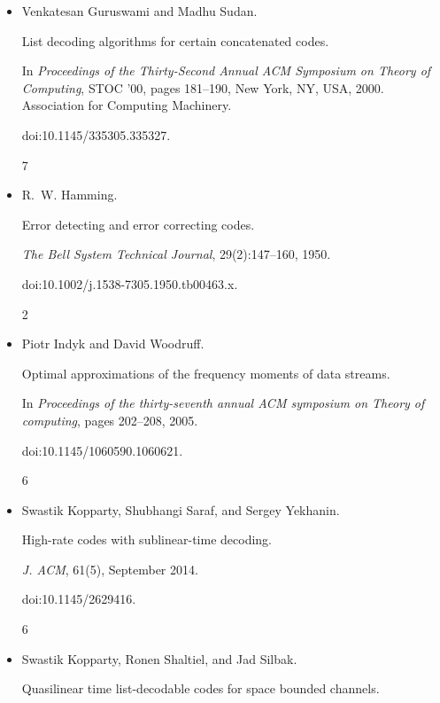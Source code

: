 \begin{itemize}
doi:10.1145/2936015.


6




\item[] 
[16]

Venkatesan Guruswami and Madhu Sudan.


List decoding algorithms for certain concatenated codes.


In \emph{Proceedings of the Thirty-Second Annual ACM Symposium on
Theory of Computing}, STOC ’00, pages 181–190, New York, NY, USA, 2000.
Association for Computing Machinery.


doi:10.1145/335305.335327.


7




\item[] 
[17]

R. W. Hamming.


Error detecting and error correcting codes.


\emph{The Bell System Technical Journal}, 29(2):147–160, 1950.


doi:10.1002/j.1538-7305.1950.tb00463.x.


2




\item[] 
[18]

Piotr Indyk and David Woodruff.


Optimal approximations of the frequency moments of data streams.


In \emph{Proceedings of the thirty-seventh annual ACM symposium on
Theory of computing}, pages 202–208, 2005.


doi:10.1145/1060590.1060621.


6




\item[] 
[19]

Swastik Kopparty, Shubhangi Saraf, and Sergey Yekhanin.


High-rate codes with sublinear-time decoding.


\emph{J. ACM}, 61(5), September 2014.


doi:10.1145/2629416.


6




\item[] 
[20]

Swastik Kopparty, Ronen Shaltiel, and Jad Silbak.


Quasilinear time list-decodable codes for space bounded channels.



\end{itemize}
